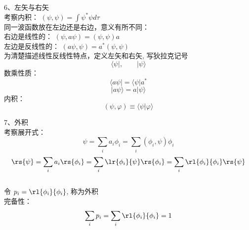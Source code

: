 \begin{frame}{}
    6、左矢与右矢\\
    考察内积： $(\psi,\psi)=\int\psi^*\psi d\tau$ \\
    同一波函数放在左边还是右边，意义有所不同： \\
    右边是线性的：  $(\psi,a\psi)=(\psi,\psi)a $ \\
    左边是反线性的：   $(a\psi,\psi)=a^* (\psi,\psi)$  \\
    为清楚描述线性反线性特点，定义左矢和右矢, 写狄拉克记号
    $$\langle \psi |, \qquad |\psi \rangle $$ 
    数乘性质： $$\langle a\psi | = \langle \psi |a^* $$
    $$ |a\psi \rangle = a|\psi \rangle$$ 
    内积：\[(\psi,\varphi)\equiv \langle \psi | \varphi \rangle\]
\end{frame}

\begin{frame}{}
    7、外积\\
    考察展开式： \[\psi=\sum_i a_i \phi_i= \sum_i (\phi_i,\psi) \phi_i\]
    \[\rs{\psi}=\sum_i a_i \rs{\phi_i}= \sum_i \lr{\phi_i}{\psi} \rs{\phi_i} =\sum_i \rl{\phi_i}{\phi_i} \rs{\psi}\]
    ~~\\
    令 $p_i= \rl{\phi_i}{\phi_i} $, 称为外积\\ {\vspace*{1em}}
    完备性：
    \[\sum_i p_i= \sum_i \rl{\phi_i}{\phi_i}=1 \]
\end{frame}

